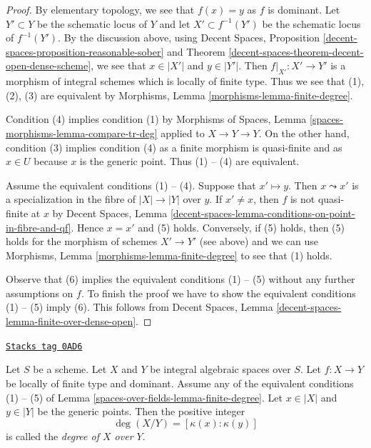 \begin{proof}
By elementary topology, we see that $f(x) = y$ as $f$ is dominant.
Let $Y' \subset Y$ be the schematic locus of $Y$ and let
$X' \subset f^{-1}(Y')$ be the schematic locus of $f^{-1}(Y')$.
By the discussion above, using
Decent Spaces, Proposition \ref{decent-spaces-proposition-reasonable-sober} and
Theorem \ref{decent-spaces-theorem-decent-open-dense-scheme},
we see that $x \in |X'|$ and $y \in |Y'|$.
Then $f|_{X'} : X' \to Y'$ is a morphism of integral schemes
which is locally of finite type. Thus we see that (1), (2), (3)
are equivalent by Morphisms, Lemma \ref{morphisms-lemma-finite-degree}.

\medskip\noindent
Condition (4) implies condition (1) by
Morphisms of Spaces, Lemma \ref{spaces-morphisms-lemma-compare-tr-deg}
applied to $X \to Y \to Y$.
On the other hand, condition (3) implies condition (4) as
a finite morphism is quasi-finite and as $x \in U$ because $x$
is the generic point. Thus (1) -- (4) are equivalent.

\medskip\noindent
Assume the equivalent conditions (1) -- (4). Suppose that
$x' \mapsto y$. Then $x \leadsto x'$ is a specialization in the
fibre of $|X| \to |Y|$ over $y$. If $x' \not = x$, then $f$ is not
quasi-finite at $x$ by Decent Spaces, Lemma
\ref{decent-spaces-lemma-conditions-on-point-in-fibre-and-qf}.
Hence $x = x'$ and (5) holds. Conversely, if (5) holds, then
(5) holds for the morphism of schemes $X' \to Y'$ (see above)
and we can use
Morphisms, Lemma \ref{morphisms-lemma-finite-degree}
to see that (1) holds.

\medskip\noindent
Observe that (6) implies the equivalent conditions (1) -- (5)
without any further assumptions on $f$. To finish the proof
we have to show the equivalent conditions (1) -- (5) imply (6).
This follows from Decent Spaces, Lemma
\ref{decent-spaces-lemma-finite-over-dense-open}.
\end{proof}

\begin{definition}[Degree]
\label{spaces-over-fields-definition-degree}
\href{https://stacks.math.columbia.edu/tag/0AD6}{\texttt{Stacks tag 0AD6}}

Let $S$ be a scheme.
Let $X$ and $Y$ be integral algebraic spaces over $S$.
Let $f : X \to Y$ be locally of finite type and dominant.
Assume any of the equivalent conditions (1) -- (5) of
Lemma \ref{spaces-over-fields-lemma-finite-degree}. Let $x \in |X|$ and $y \in |Y|$
be the generic points. Then the positive integer
$$
\deg(X/Y) = [\kappa(x) : \kappa(y)]
$$
is called the {\it degree of $X$ over $Y$}.
\end{definition}

